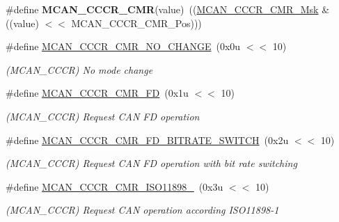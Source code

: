 \begin{DoxyCompactItemize}
\#define {\bfseries M\+C\+A\+N\+\_\+\+C\+C\+C\+R\+\_\+\+C\+MR}(value)~((\mbox{\hyperlink{group__SAMV71__MCAN_ga4f1990ddca877eced483f7aa6eba8611}{M\+C\+A\+N\+\_\+\+C\+C\+C\+R\+\_\+\+C\+M\+R\+\_\+\+Msk}} \& ((value) $<$$<$ M\+C\+A\+N\+\_\+\+C\+C\+C\+R\+\_\+\+C\+M\+R\+\_\+\+Pos)))
\item 
\mbox{\label{group__SAME70__MCAN_gad1f5468a2fc76d398a658e796072d346}} 
\#define \mbox{\hyperlink{group__SAME70__MCAN_gad1f5468a2fc76d398a658e796072d346}{M\+C\+A\+N\+\_\+\+C\+C\+C\+R\+\_\+\+C\+M\+R\+\_\+\+N\+O\+\_\+\+C\+H\+A\+N\+GE}}~(0x0u $<$$<$ 10)
\begin{DoxyCompactList}\small\item\em (M\+C\+A\+N\+\_\+\+C\+C\+CR) No mode change \end{DoxyCompactList}\item 
\mbox{\label{group__SAME70__MCAN_ga28057c9d6774e797e29167e55ab0e50f}} 
\#define \mbox{\hyperlink{group__SAME70__MCAN_ga28057c9d6774e797e29167e55ab0e50f}{M\+C\+A\+N\+\_\+\+C\+C\+C\+R\+\_\+\+C\+M\+R\+\_\+\+FD}}~(0x1u $<$$<$ 10)
\begin{DoxyCompactList}\small\item\em (M\+C\+A\+N\+\_\+\+C\+C\+CR) Request C\+AN FD operation \end{DoxyCompactList}\item 
\mbox{\label{group__SAME70__MCAN_ga81e172de8451e1c44243d29ef77ca637}} 
\#define \mbox{\hyperlink{group__SAME70__MCAN_ga81e172de8451e1c44243d29ef77ca637}{M\+C\+A\+N\+\_\+\+C\+C\+C\+R\+\_\+\+C\+M\+R\+\_\+\+F\+D\+\_\+\+B\+I\+T\+R\+A\+T\+E\+\_\+\+S\+W\+I\+T\+CH}}~(0x2u $<$$<$ 10)
\begin{DoxyCompactList}\small\item\em (M\+C\+A\+N\+\_\+\+C\+C\+CR) Request C\+AN FD operation with bit rate switching \end{DoxyCompactList}\item 
\mbox{\label{group__SAME70__MCAN_gacef65a446f9590ee85daa1e80ce0dcec}} 
\#define \mbox{\hyperlink{group__SAME70__MCAN_gacef65a446f9590ee85daa1e80ce0dcec}{M\+C\+A\+N\+\_\+\+C\+C\+C\+R\+\_\+\+C\+M\+R\+\_\+\+I\+S\+O11898\+\_}}~(0x3u $<$$<$ 10)
\begin{DoxyCompactList}\small\item\em (M\+C\+A\+N\+\_\+\+C\+C\+CR) Request C\+AN operation according I\+S\+O11898-\/1 \end{DoxyCompactList}\item 
$$
\end{DoxyCompactItemize}
